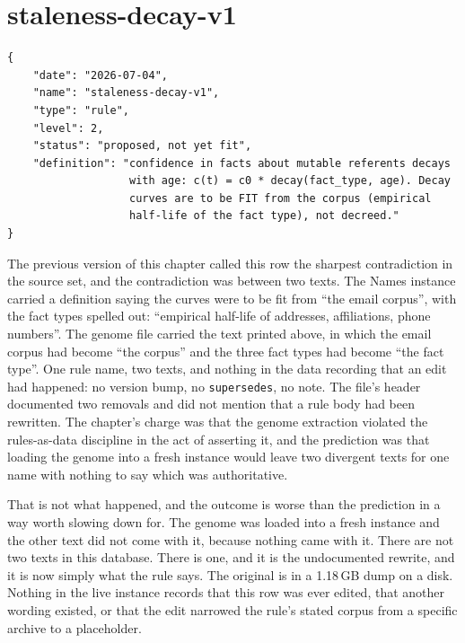 \section{staleness-decay-v1}
\label{sec:staleness}

\begin{lstlisting}[language={},basicstyle=\ttfamily\footnotesize]
{
    "date": "2026-07-04",
    "name": "staleness-decay-v1",
    "type": "rule",
    "level": 2,
    "status": "proposed, not yet fit",
    "definition": "confidence in facts about mutable referents decays
                   with age: c(t) = c0 * decay(fact_type, age). Decay
                   curves are to be FIT from the corpus (empirical
                   half-life of the fact type), not decreed."
}
\end{lstlisting}

The previous version of this chapter called this row the sharpest contradiction in the source set, and the contradiction was between two texts. The Names instance carried a definition saying the curves were to be fit from ``the email corpus'', with the fact types spelled out: ``empirical half-life of addresses, affiliations, phone numbers''. The genome file carried the text printed above, in which the email corpus had become ``the corpus'' and the three fact types had become ``the fact type''. One rule name, two texts, and nothing in the data recording that an edit had happened: no version bump, no \texttt{supersedes}, no note. The file's header documented two removals and did not mention that a rule body had been rewritten. The chapter's charge was that the genome extraction violated the rules-as-data discipline in the act of asserting it, and the prediction was that loading the genome into a fresh instance would leave two divergent texts for one name with nothing to say which was authoritative.

That is not what happened, and the outcome is worse than the prediction in a way worth slowing down for. The genome was loaded into a fresh instance and the other text did not come with it, because nothing came with it. There are not two texts in this database. There is one, and it is the undocumented rewrite, and it is now simply what the rule says. The original is in a 1.18\,GB dump on a disk. Nothing in the live instance records that this row was ever edited, that another wording existed, or that the edit narrowed the rule's stated corpus from a specific archive to a placeholder.

